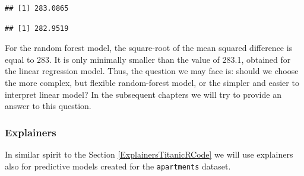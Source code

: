 \documentclass[12pt,]{krantz}
\newenvironment{Shaded}{\begin{snugshade}}{\end{snugshade}}
\newcommand{\DataTypeTok}[1]{\textcolor[rgb]{0.13,0.29,0.53}{#1}}
\newcommand{\DecValTok}[1]{\textcolor[rgb]{0.00,0.00,0.81}{#1}}
\newcommand{\KeywordTok}[1]{\textcolor[rgb]{0.13,0.29,0.53}{\textbf{#1}}}
\newcommand{\NormalTok}[1]{#1}
\newcommand{\OperatorTok}[1]{\textcolor[rgb]{0.81,0.36,0.00}{\textbf{#1}}}
\newcommand{\StringTok}[1]{\textcolor[rgb]{0.31,0.60,0.02}{#1}}
\begin{document}
\begin{verbatim}
## [1] 283.0865
\end{verbatim}

\begin{Shaded}
\end{Shaded}

\begin{verbatim}
## [1] 282.9519
\end{verbatim}

For the random forest model, the square-root of the mean squared difference is equal to 283. It is only minimally smaller than the value of 283.1, obtained for the linear regression model. Thus, the question we may face is: should we choose the more complex, but flexible random-forest model, or the simpler and easier to interpret linear model? In the subsequent chapters we will try to provide an answer to this question.

\hypertarget{ExplainersApartmentsRCode}{%
\subsubsection{Explainers}\label{ExplainersApartmentsRCode}}

In similar spirit to the Section \ref{ExplainersTitanicRCode} we will use explainers also for predictive models created for the \texttt{apartments} dataset.

\begin{Shaded}
\end{Shaded}
\end{document}
